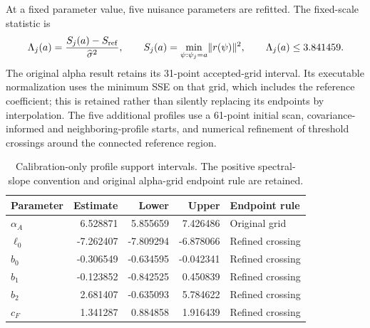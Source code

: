 \documentclass[11pt,a4paper]{article}
\begin{document}
At a fixed parameter value, five nuisance parameters are refitted. The fixed-scale statistic is
\begin{equation}
 \Lambda_j(a)=\frac{S_j(a)-S_{\rm ref}}{\widehat\sigma^2},\qquad
 S_j(a)=\min_{\psi:\psi_j=a}\lVert r(\psi)\rVert^2,
 \qquad \Lambda_j(a)\leq3.841459.
\end{equation}
The original alpha result retains its 31-point accepted-grid interval. Its executable normalization uses the minimum SSE on that grid, which includes the reference coefficient; this is retained rather than silently replacing its endpoints by interpolation. The five additional profiles use a 61-point initial scan, covariance-informed and neighboring-profile starts, and numerical refinement of threshold crossings around the connected reference region.

\begin{table}[htbp]\centering\small
\caption{Calibration-only profile support intervals. The positive spectral-slope convention and original alpha-grid endpoint rule are retained.}
\label{tab:profiles}
\begin{tabular}{lrrrl}
\toprule
Parameter & Estimate & Lower & Upper & Endpoint rule \\
\midrule
$\alpha_A$ & 6.528871 & 5.855659 & 7.426486 & Original grid \\
$\ell_0$ & -7.262407 & -7.809294 & -6.878066 & Refined crossing \\
$b_0$ & -0.306549 & -0.634595 & -0.042341 & Refined crossing \\
$b_1$ & -0.123852 & -0.842525 & 0.450839 & Refined crossing \\
$b_2$ & 2.681407 & -0.635093 & 5.784622 & Refined crossing \\
$c_F$ & 1.341287 & 0.884858 & 1.916439 & Refined crossing \\
\bottomrule
\end{tabular}
\end{table}
\end{document}
